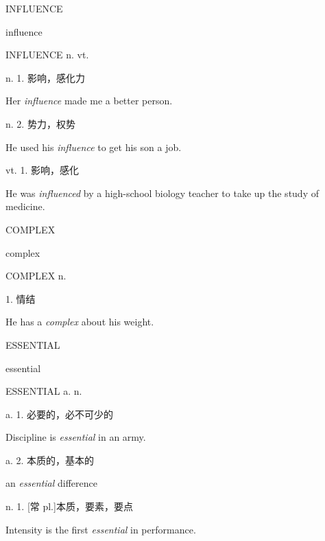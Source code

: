 \begin{flashcard}{
INFLUENCE

influence
}
\begin{center}
INFLUENCE n. vt. 
\end{center}
n. 1. 影响，感化力

Her \textit{influence} made me a better person.

n. 2. 势力，权势

He used his \textit{influence} to get his son a job.

vt. 1. 影响，感化

He was \textit{influenced} by a high-school biology teacher to take up the study of medicine.

\end{flashcard}
\begin{flashcard}{
COMPLEX

complex
}
\begin{center}
COMPLEX n. 
\end{center}
1. 情结

He has a \textit{complex} about his weight.

\end{flashcard}
\begin{flashcard}{
ESSENTIAL

essential
}
\begin{center}
ESSENTIAL a. n. 
\end{center}
a. 1. 必要的，必不可少的

Discipline is \textit{essential} in an army.

a. 2. 本质的，基本的

an \textit{essential} difference

n. 1. [常 pl.]本质，要素，要点

Intensity is the first \textit{essential} in performance.

\end{flashcard}
